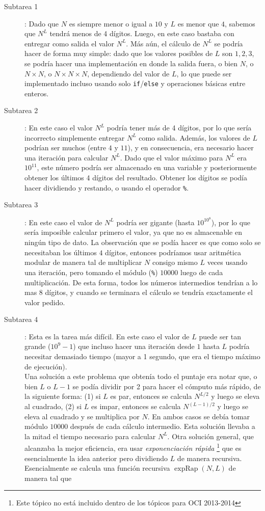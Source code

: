 \begin{description}
\item[Subtarea 1]: Dado que $N$ es siempre menor o igual
a $10$ y $L$ es menor que $4$, sabemos que $N^L$ tendrá menos de 4 dígitos.
Luego, en este caso bastaba con entregar como salida el valor $N^L$.
Más aún, el cálculo de $N^L$ se podría hacer de forma muy simple: 
dado que los valores posibles de $L$ son $1,2,3$, 
se podría hacer una implementación en donde la salida fuera, 
o bien $N$, o $N\times N$, o $N\times N\times N$, dependiendo del valor de $L$,
lo que puede ser implementado incluso usando solo \texttt{if}/\texttt{else} y 
operaciones básicas entre enteros.

\item[Subtarea 2]: En este caso el valor $N^L$ podría tener más de 4 dígitos, por lo que sería incorrecto simplemente entregar $N^L$ como salida.
Además, los valores de $L$ podrían ser muchos (entre $4$ y $11$),
y en consecuencia, era necesario hacer una iteración para calcular $N^L$.
Dado que el valor máximo para $N^L$ era $10^{11}$, este número podría ser
almacenado en una variable y posteriormente obtener los últimos 4 dígitos del resultado.
Obtener los dígitos se podía hacer dividiendo y restando, o usando el 
operador \texttt{\%}.

\item[Subtarea 3]: En este caso el valor de $N^L$ podría ser gigante (hasta $10^{10^8}$), por lo que sería imposible calcular primero el valor, ya que no es almacenable en ningún tipo de dato.
La observación que se podía hacer es que como solo se necesitaban los últimos $4$ dígitos, entonces podríamos usar aritmética modular de manera tal de multiplicar $N$ consigo mismo $L$ veces usando una iteración, pero tomando el módulo (\texttt{\%}) $10000$ luego de cada multiplicación. De esta
forma, todos los números intermedios tendrían a lo mas $8$ dígitos, y cuando se terminara el cálculo se tendría exactamente el valor pedido.


\item[Subtarea 4]: Esta es la tarea más difícil. En este caso el valor de $L$ puede ser tan grande ($10^9-1$) que incluso hacer una iteración desde $1$ hasta $L$ podría necesitar demasiado tiempo (mayor a 1 segundo, que era el tiempo máximo de ejecución).\\
Una solución a este problema que obtenía todo el puntaje era notar que, o bien
$L$ o $L-1$ se podía dividir por 2 para hacer el cómputo más rápido, de la
siguiente forma: (1) si $L$ es par, entonces se calcula $N^{L/2}$ y luego se
eleva al cuadrado, (2) si $L$ es impar, entonces se calcula $N^{(L-1)/2}$ y
luego se eleva al cuadrado y se multiplica por $N$.
En ambos casos se debía tomar módulo $10000$ después de cada cálculo intermedio.
Esta solución llevaba a la mitad el tiempo necesario para calcular $N^L$.
Otra solución general, que alcanzaba la mejor eficiencia, era usar
\emph{exponenciación rápida}%
\footnote{Este tópico no está incluido dentro de los tópicos para OCI 2013-2014}
que es esencialmente la idea anterior pero dividiendo $L$ de manera recursiva.
Esencialmente se calcula una función recursiva $\operatorname{expRap}(N,L)$ de manera tal que


\end{description}
